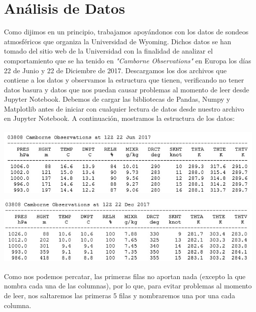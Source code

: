 \documentclass[12pt]{article}
\begin{document}
\section*{Análisis de Datos}


Como dijimos en un principio, trabajamos apoyándonos con los datos de sondeos atmosféricos que organiza la Universidad de Wyoming. Dichos datos se han tomado del sitio web de la Universidad con la finalidad de analizar el comportamiento que se ha tenido en \textit{"Camborne Observations"} en Europa los días 22 de Junio y 22 de Diciembre de 2017. Descargamos los dos archivos que contiene a los datos y observamos la estructura que tienen, verificando no tener datos basura y datos que nos puedan causar problemas al momento de leer desde Jupyter Notebook. Debemos de cargar las bibliotecas de Pandas, Numpy y Matplotlib antes de iniciar con cualquier lectura de datos desde nuestro archivo en Jupyter Notebook. A continuación, mostramos la estructura de los datos:
\begin{center}
	\includegraphics[height=3.5cm]{DatosJ.jpg}
    \includegraphics[height=3.5cm]{DatosD.jpg}
\end{center}
Como nos podemos percatar, las primeras filas no aportan nada (excepto la que nombra cada una de las columnas), por lo que, para evitar problemas al momento de leer, nos saltaremos las primeras 5 filas y nombraremos una por una cada columna.\\
\end{document}
